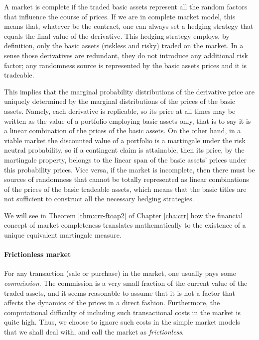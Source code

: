 A market is complete if the traded basic assets represent all the random factors that influence the course of prices. If we are in complete market model, this means that, whatever be the contract, one can always set a hedging strategy that equals the final value of the derivative. This hedging
strategy employs, by definition, only the basic assets (riskless and risky) traded on the market. In a sense those derivatives are redundant, they do not introduce any additional risk factor; any randomness source is represented by the basic assets prices and it is tradeable.

This implies that the marginal probability distributions of the derivative price are uniquely determined by the marginal distributions of the prices of the basic assets. Namely, each derivative is replicable, so its price at all times may be written as the value of a portfolio employing basic assets only, that is to say it is a linear combination of the prices of the basic assets. On the other hand, in a viable market the discounted value of a portfolio is a martingale under the risk neutral probability, so if a contingent claim is attainable, then its price, by the martingale property, belongs to the linear span of the basic assets’ prices under this probability prices. Vice versa, if the market is incomplete, then there must be sources of randomness that cannot be totally represented as linear combinations of the prices of the basic tradeable assets, which means that the basic titles are not sufficient to construct all the necessary hedging strategies.

We will see in Theorem \ref{thm:crr-ftoap2} of Chapter \ref{cha:crr} how the financial concept of market completeness translates mathematically to the existence of a unique equivalent martingale measure.


\paragraph{Frictionless market}
For any transaction (sale or purchase) in the market, one usually pays some \emph{commission}. The commission is a very small fraction of the current value of the traded assets, and it seems reasonable to assume that it is not a factor that affects the dynamics of the prices in a direct fashion. Furthermore, the computational difficulty of including such transactional costs in the market is quite high. Thus, we choose to ignore such costs in the simple market models that we shall deal with, and call the market as \emph{frictionless}.

